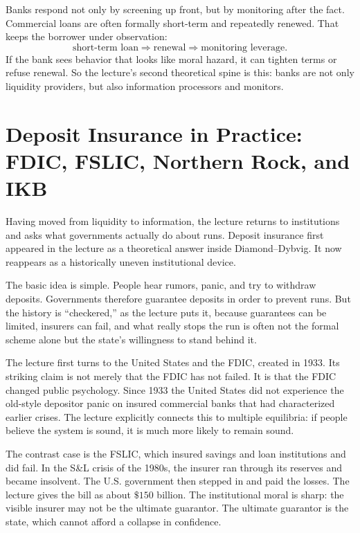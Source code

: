 Banks respond not only by screening up front, but by monitoring after the fact. Commercial loans are often formally short-term and repeatedly renewed. That keeps the borrower under observation:
\begin{equation}
\text{short-term loan}
\Rightarrow
\text{renewal}
\Rightarrow
\text{monitoring leverage}.
\end{equation}
If the bank sees behavior that looks like moral hazard, it can tighten terms or refuse renewal. So the lecture's second theoretical spine is this: banks are not only liquidity providers, but also information processors and monitors.

\section{Deposit Insurance in Practice: FDIC, FSLIC, Northern Rock, and IKB}

Having moved from liquidity to information, the lecture returns to institutions and asks what governments actually do about runs. Deposit insurance first appeared in the lecture as a theoretical answer inside Diamond--Dybvig. It now reappears as a historically uneven institutional device.

The basic idea is simple. People hear rumors, panic, and try to withdraw deposits. Governments therefore guarantee deposits in order to prevent runs. But the history is ``checkered,'' as the lecture puts it, because guarantees can be limited, insurers can fail, and what really stops the run is often not the formal scheme alone but the state's willingness to stand behind it.

The lecture first turns to the United States and the FDIC, created in 1933. Its striking claim is not merely that the FDIC has not failed. It is that the FDIC changed public psychology. Since 1933 the United States did not experience the old-style depositor panic on insured commercial banks that had characterized earlier crises. The lecture explicitly connects this to multiple equilibria: if people believe the system is sound, it is much more likely to remain sound.

The contrast case is the FSLIC, which insured savings and loan institutions and did fail. In the S\&L crisis of the 1980s, the insurer ran through its reserves and became insolvent. The U.S. government then stepped in and paid the losses. The lecture gives the bill as about \(\$150\) billion. The institutional moral is sharp: the visible insurer may not be the ultimate guarantor. The ultimate guarantor is the state, which cannot afford a collapse in confidence.

